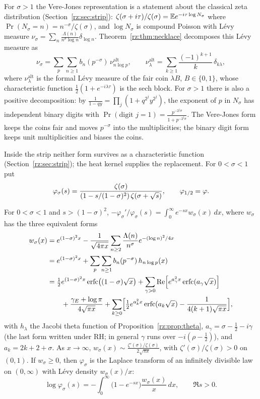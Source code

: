 For $\sigma>1$ the Vere-Jones representation is a statement about the classical zeta distribution (Section~\ref{rz:sec:strip}): $\zeta(\sigma+i\tau)/\zeta(\sigma)=\E e^{-i\tau\log N_\sigma}$ where $\Pr(N_\sigma=n)=n^{-\sigma}/\zeta(\sigma)$, and $\log N_\sigma$ is compound Poisson with L\'evy measure $\nu_\sigma=\sum_n\frac{\Lambda(n)}{n^\sigma\log n}\delta_{\log n}$. Theorem~\ref{rz:thm:necklace} decomposes this L\'evy measure as
\[
\nu_\sigma=\sum_p\sum_{n\ge1}b_n(p^{-\sigma})\,\nu^{\mathrm{alt}}_{n\log p},\qquad\nu^{\mathrm{alt}}_\lambda=\sum_{k\ge1}\frac{(-1)^{k+1}}k\,\delta_{k\lambda},
\]
where $\nu^{\mathrm{alt}}_\lambda$ is the formal L\'evy measure of the fair coin $\lambda B$, $B\in\{0,1\}$, whose characteristic function $\frac12(1+e^{-i\lambda\tau})$ is the sech block. For $\sigma>1$ there is also a positive decomposition: by $\frac1{1-qy}=\prod_j(1+q^{2^j}y^{2^j})$, the exponent of $p$ in $N_\sigma$ has independent binary digits with $\Pr(\text{digit }j=1)=\frac{p^{-2^j\sigma}}{1+p^{-2^j\sigma}}$. The Vere-Jones form keeps the coins fair and moves $p^{-\sigma}$ into the multiplicities; the binary digit form keeps unit multiplicities and biases the coins.

Inside the strip neither form survives as a characteristic function (Section~\ref{rz:sec:strip}); the heat kernel supplies the replacement. For $0<\sigma<1$ put
\[
\varphi_\sigma(s)=\frac{\zeta(\sigma)}{(1-s/(1-\sigma)^2)\,\zeta(\sigma+\sqs)},\qquad\varphi_{1/2}=\varphi .
\]

\begin{theorem}\label{rz:thm:levystrip}
For $0<\sigma<1$ and $s>(1-\sigma)^2$, $-\varphi_\sigma'/\varphi_\sigma(s)=\int_0^\infty e^{-sx}w_\sigma(x)\,dx$, where $w_\sigma$ has the three equivalent forms
\begin{align*}
w_\sigma(x)&=e^{(1-\sigma)^2x}-\frac{1}{\sqrt{4\pi x}}\sum_{n\ge2}\frac{\Lambda(n)}{n^\sigma}e^{-(\log n)^2/4x}\\
&=e^{(1-\sigma)^2x}+\sum_p\sum_{n\ge1}b_n(p^{-\sigma})\,h_{n\log p}(x)\\
&=\tfrac12e^{(1-\sigma)^2x}\operatorname{erfc}\bigl((1-\sigma)\sqrt x\bigr)+\sum_{\gamma>0}\Re\Bigl[e^{a_\gamma^2x}\operatorname{erfc}(a_\gamma\sqrt x)\Bigr]\\
&\qquad+\frac{\gamma_E+\log\pi}{4\sqrt{\pi x}}+\sum_{k\ge0}\Bigl[\tfrac12e^{a_k^2x}\operatorname{erfc}(a_k\sqrt x)-\frac1{4(k+1)\sqrt{\pi x}}\Bigr],
\end{align*}
with $h_\lambda$ the Jacobi theta function of Proposition~\ref{rz:prop:theta}, $a_\gamma=\sigma-\frac12-i\gamma$ (the last form written under RH; in general $\gamma$ runs over $-i(\rho-\frac12)$), and $a_k=2k+2+\sigma$. As $x\to\infty$, $w_\sigma(x)\sim\frac{\zeta'(\sigma)/\zeta(\sigma)}{2\sqrt{\pi x}}$, with $\zeta'(\sigma)/\zeta(\sigma)>0$ on $(0,1)$. If $w_\sigma\ge0$, then $\varphi_\sigma$ is the Laplace transform of an infinitely divisible law on $(0,\infty)$ with L\'evy density $w_\sigma(x)/x$:
\[
\log\varphi_\sigma(s)=-\int_0^\infty\bigl(1-e^{-sx}\bigr)\frac{w_\sigma(x)}x\,dx,\qquad\Re s>0 .
\]
\end{theorem}


